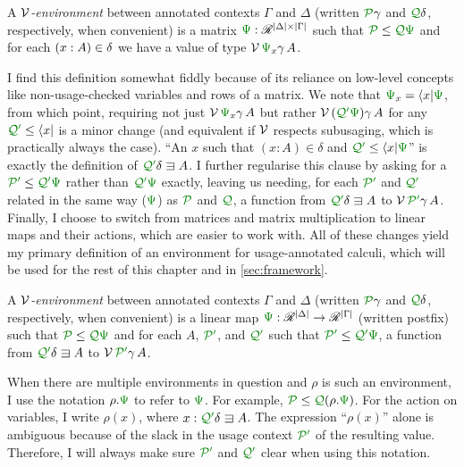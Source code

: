 \begin{definition}
  A \emph{$\mathcal V$-environment} between annotated contexts $\Gamma$ and $\Delta$
  (written $\grP\gamma$ and $\grQ\delta$, respectively, when convenient)
  is a matrix $\gr\Psi : \Ann^{\size\Delta \times \size\Gamma}$ such that
  $\grP \leq \grQ\gr\Psi$ and for each
  $\plr{x : A} \in \delta$ we have a value of type $\V\,\gr\Psi_x\gamma\,A$.
\end{definition}

I find this definition somewhat fiddly because of its reliance on low-level
concepts like non-usage-checked variables and rows of a matrix.
We note that $\gr\Psi_x = \bra x\gr\Psi$, from which point, requiring not
just $\V\,\gr\Psi_x\gamma\,A$ but rather $\V\,\plr{\grQprime\gr\Psi}\gamma\,A$
for any $\grQprime \leq \bra x$ is a minor change (and equivalent if $\mathcal V$
respects subusaging, which is practically always the case).
``An $x$ such that $(x : A) \in \delta$ and $\grQprime \leq \bra x\gr\Psi$''
is exactly the definition of $\grQprime\delta \sqni A$.
I further regularise this clause by asking for a
$\grPprime \leq \grQprime\gr\Psi$ rather than $\grQprime\gr\Psi$ exactly,
leaving us needing, for each $\grPprime$ and $\grQprime$ related in the same
way ($\gr\Psi$) as $\grP$ and $\grQ$, a function from $\grQprime\delta \sqni A$
to $\V\,\grPprime\gamma\,A$.
Finally, I choose to switch from matrices and matrix multiplication to
linear maps and their actions, which are easier to work with.
All of these changes yield my primary definition of an environment for
usage-annotated calculi, which will be used for the rest of this chapter and in
\cref{sec:framework}.

\begin{definition}\label{def:lr-env}
  A \emph{$\mathcal V$-environment} between annotated contexts $\Gamma$ and $\Delta$
  (written $\grP\gamma$ and $\grQ\delta$, respectively, when convenient)
  is a linear map $\gr\Psi : \Ann^{\size\Delta} \to \Ann^{\size\Gamma}$ (written
  postfix) such that $\grP \leq \grQ\gr\Psi$ and for each $A$, $\grPprime$, and
  $\grQprime$ such that $\grPprime \leq \grQprime\gr\Psi$, a function from
  $\grQprime\delta \sqni A$ to $\V\,\grPprime\gamma\,A$.
\end{definition}
\begin{notation}
  When there are multiple environments in question and $\rho$ is such an
  environment, I use the notation $\rho.\gr\Psi$ to refer to $\gr\Psi$.
  For example, $\grP \leq \grQ\plr{\rho.\gr\Psi}$.
  For the action on variables, I write $\rho(x)$, where
  $x : \grQprime\delta \sqni A$.
  The expression ``$\rho(x)$'' alone is ambiguous because of the slack in the
  usage context $\grPprime$ of the resulting value.
  Therefore, I will always make sure $\grPprime$ and $\grQprime$ clear when
  using this notation.
\end{notation}

